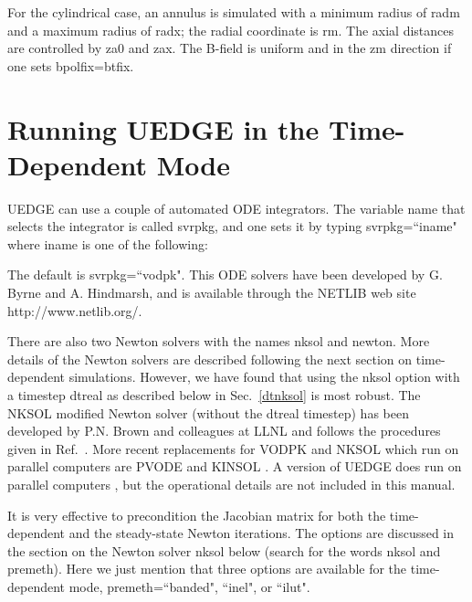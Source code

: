 \documentclass [12pt]{article}
\def\hsa{\hskip.4truein}
\def\hsp6{\hskip.6truein}
\begin{document}
For the cylindrical case, an annulus is simulated with a minimum radius of
{\sf radm} and a maximum radius of {\sf radx}; the radial coordinate is {\sf
  rm}.  The axial distances are controlled by {\sf za0} and {\sf zax}.  The
B-field is uniform and in the {\sf zm} direction if one sets {\sf
  bpolfix=btfix}.

 
\section{Running {\sf UEDGE} in the Time-Dependent Mode}

{\sf UEDGE} can use a couple of automated ODE integrators. The variable name
that selects the integrator is called svrpkg, and one sets it by typing {\sf
  svrpkg=``iname"} where iname is one of the following: {\sf
{}
}

The default is {\sf svrpkg=``vodpk"}. This ODE solvers have been developed by
G. Byrne \cite{byrne92} and A. Hindmarsh, and is available through the {\sf
NETLIB} web site {\sf http://www.netlib.org/}.

There are also two Newton solvers with the names {\sf nksol} and {\sf newton}.
More details of the Newton solvers are described following the next section on
time-dependent simulations.  However, we have found that using the {\sf nksol}
option with a timestep {\sf dtreal} as described below in Sec.~\ref{dtnksol}
is most robust.  The {\sf NKSOL} modified Newton solver (without the {\sf
dtreal} timestep) has been developed by P.N. Brown and colleagues at LLNL and
follows the procedures given in Ref.~.  More recent
replacements for {\sf VODPK} and {\sf NKSOL} which run on parallel computers
are {\sf PVODE} and {\sf KINSOL} \cite{hindm98}.  A version of {\sf UEDGE}
does run on parallel computers \cite{rog_pu}, but the operational details are
not included in this manual.


It is very effective to precondition the Jacobian matrix for both the
time-dependent and the steady-state Newton iterations. The options are
discussed in the section on the Newton solver {\sf nksol} below (search for
the words nksol and premeth). Here we just mention that three options are
available for the time-dependent mode, {\sf premeth=``banded", ``inel", or
``ilut"}.
\end{document}
